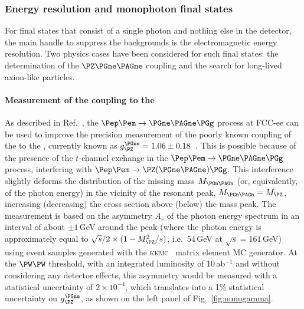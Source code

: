 \subsubsection{Energy resolution and monophoton final states}

For final states that consist of a single photon and nothing else in the detector, the main handle to suppress the backgrounds is the electromagnetic energy resolution.
Two physics cases have been considered for such final states: 
the determination of the $\PZ \PGne \PAGne$ coupling and the search for long-lived axion-like particles.

\paragraph{Measurement of the \texorpdfstring{\PZ}{Z} coupling to the \texorpdfstring{\PGne}{nu-e}}

As described in Ref.~\cite{Aleksan_2019}, the $\epem \to \PGne \PAGne \PGg$ process at FCC-ee can be used to improve the precision measurement of the poorly known coupling of the \PZ to the \PGne, 
currently known as $g^{\PGne}_{\PZ} = 1.06\pm 0.18$~\cite{ParticleDataGroup:2024cfk}.
This is possible because of the presence of the $t$-channel \PW exchange in the $\epem \to \PGne \PAGne \PGg$ process, interfering with $\epem \to \PZ(\PGne \PAGne) \PGg$. 
This interference slightly deforms the distribution of the missing mass $M_{\PGn \PAGn}$ (or, equivalently, of the photon energy) in the vicinity of the resonant peak, $M_{\PGn \PAGn} = M_{\PZ}$, 
increasing (decreasing) the cross section above (below) the mass peak.
The measurement is based on the asymmetry $A_s$ of the photon energy spectrum in an interval of about $\pm 1$\,GeV around the peak 
(where the photon energy is approximately equal to $\sqrt{s}/2 \times (1 - M^2_{\PZ} / s)$, i.e.\ 54\,GeV at $\sqrt{s} = 161$\,GeV)
using event samples generated with the \textsc{kkmc}~\cite{Arbuzov:2020coe,Arbuzov_2021} matrix element MC generator.   
At the $\PW\PW$ threshold, with an integrated luminosity of 10\,ab$^{-1}$ and without considering any detector effects, 
this asymmetry would be measured with a statistical uncertainty of $2 \times 10^{-4}$, which translates into a 1\%  statistical uncertainty on $g^{\PGne}_{\PZ}$, 
as shown on the left panel of Fig.~\ref{fig:nunugamma}.

